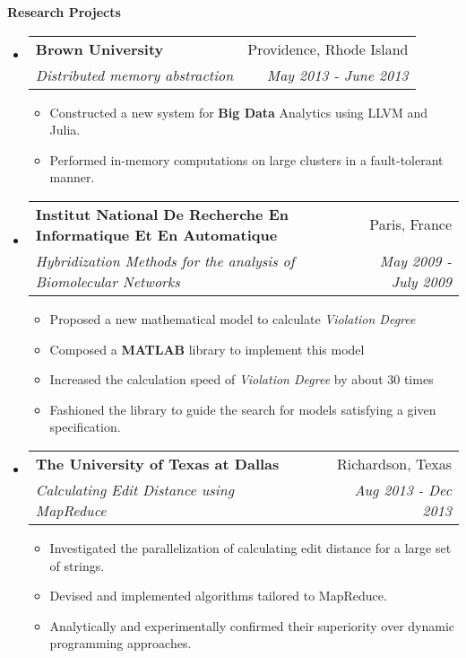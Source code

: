 \documentclass[letterpaper,11pt]{article}
\makeatletter
\newcommand{\resitem}[1]{\item[\ding{226}] #1 \vspace{-2pt}}
\newcommand{\resheading}[1]{{\large \colorbox{mygrey}{\begin{minipage}{\textwidth}{\textbf{#1 \vphantom{p\^{E}}}}\end{minipage}}}}
\newcommand{\ressubheading}[4]{
\begin{tabular*}{7.0in}{l@{\extracolsep{\fill}}r}
		\textbf{#1} & #2 \\
		\textit{#3} & \textit{#4} \\
\end{tabular*}\vspace{-6pt}}
\newcommand{\reslineheading}[2]{
\begin{tabular*}{7.0in}{l@{\extracolsep{\fill}}r}
		\textbf{#1} & #2 \\
\end{tabular*}\vspace{-6pt}}
\makeatother
\begin{document}
\resheading{Research Projects}
\begin{itemize}

\item
	\ressubheading{Brown University}{Providence, Rhode Island}{Distributed memory abstraction}{May 2013 - June 2013}
	\begin{itemize}
		\resitem{Constructed a new system for \textbf{Big Data} Analytics using LLVM and Julia.} 
		\resitem{Performed in-memory computations on large clusters in a fault-tolerant manner.}
	\end{itemize}

\item
	\ressubheading{Institut National De Recherche En Informatique Et En Automatique}{Paris, France}{Hybridization Methods for the analysis of Biomolecular Networks}{May 2009 - July 2009}
	\begin{itemize}
		\resitem{Proposed a new mathematical model to calculate \textit{Violation Degree}}%
        \resitem{Composed a \textbf{MATLAB} library to implement this model}
        \resitem{Increased the calculation speed of \textit{Violation Degree} by about 30 times}
        \resitem{Fashioned the library to guide the search for models satisfying a given specification.}
	\end{itemize}


\item
	\ressubheading{The University of Texas at Dallas}{Richardson, Texas}{Calculating Edit Distance using MapReduce}{\textit{Aug 2013 - Dec 2013}}
	\begin{itemize}
		\resitem{Investigated the parallelization of calculating edit distance for a large set of strings.} 
		\resitem{Devised and implemented algorithms tailored to MapReduce.}
        \resitem{Analytically and experimentally confirmed their superiority over dynamic programming approaches.} 
	\end{itemize}


\end{itemize}
\end{document}
